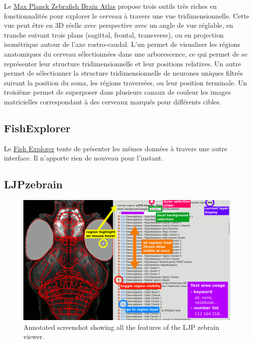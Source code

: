 Le \href{https://fishatlas.neuro.mpg.de/}{Max Planck Zebrafish Brain Atlas} propose trois outils très riches en fonctionnalités pour explorer le cerveau à travers une vue tridimensionnelle. Cette vue peut être en 3D réelle avec perspective avec un angle de vue réglable, en tranche suivant trois plans (sagittal, frontal, transverse), ou en projection isométrique autour de l'axe rostro-caudal.
L'un permet de visualiser les régions anatomiques du cerveau sélectionnées dans une arborescence, ce qui permet de se représenter leur structure tridimensionnelle et leur positions relatives.
Un autre permet de sélectionner la structure tridimensionnelle de neurones uniques filtrés suivant la position du soma, les régions traversées, ou leur position terminale. Un troisième permet de superposer dans plusieurs canaux de couleur les images matricielles correspondant à des cerveaux marqués pour différents cibles.

\subsection{FishExplorer}

Le \href{https://zebrafishatlas.zib.de/}{Fish Explorer} tente de présenter les mêmes données à travers une autre interface. Il n'apporte rien de nouveau pour l'instant.

\subsection{LJPzebrain}

\begin{figure}
\centering
\includegraphics[width=\textwidth]{./files/LJPzebrain_screenshot.png}
\caption{Annotated screenshot showing all the features of the LJP zebrain viewer.}
\end{figure}

